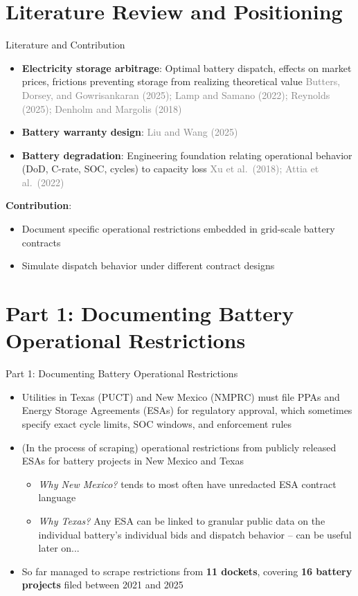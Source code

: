 \documentclass{beamer}
\begin{document}
\section{Literature Review and Positioning}

\begin{frame}{Literature and Contribution}
\begin{itemize}
    \item \textbf{Electricity storage arbitrage}: Optimal battery dispatch, effects on market prices, frictions preventing storage from realizing theoretical value \textcolor{gray}{\small Butters, Dorsey, and Gowrisankaran (2025); Lamp and Samano (2022); Reynolds (2025); Denholm and Margolis (2018)}
    \item \textbf{Battery warranty design}: \textcolor{gray}{\small  Liu and Wang (2025)}
    \item \textbf{Battery degradation}: Engineering foundation relating operational behavior (DoD, C-rate, SOC, cycles) to capacity loss \textcolor{gray}{\small Xu et al.\ (2018); Attia et al.\ (2022)}
\end{itemize}
\textbf{Contribution}: 
\begin{itemize}
    \item Document specific operational restrictions embedded in grid-scale battery contracts
    \item Simulate dispatch behavior under different contract designs
\end{itemize}
\end{frame}



\section{Part 1: Documenting Battery Operational Restrictions}


\begin{frame}{Part 1: Documenting Battery Operational Restrictions}
\begin{itemize}
    \item Utilities in Texas (PUCT) and New Mexico (NMPRC) must file PPAs and Energy Storage Agreements (ESAs) for regulatory approval, which sometimes specify exact cycle limits, SOC windows, and enforcement rules
    \item (In the process of scraping) operational restrictions from publicly released ESAs for battery projects in New Mexico and Texas
    \begin{itemize}
        \item \textit{Why New Mexico?} tends to most often have unredacted ESA contract language
        \item \textit{Why Texas?} Any ESA can be linked to granular public data on the individual battery's individual bids and dispatch behavior -- can be useful later on...
    \end{itemize}
    \item So far managed to scrape restrictions from \textbf{11 dockets}, covering \textbf{16 battery projects} filed between 2021 and 2025
\end{itemize}
\end{frame}
\end{document}
